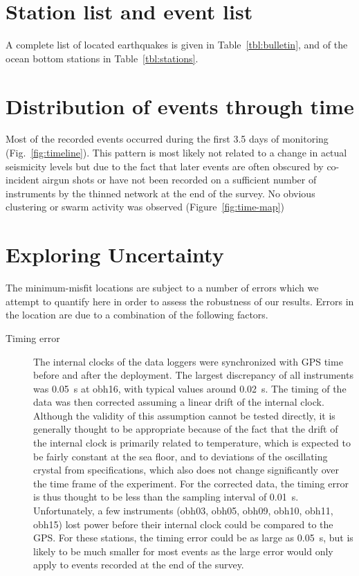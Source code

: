 \documentclass[jgr]{agu2001}
\newlength{\tw}
\begin{document}
\begin{article}
\appendix

\section{Station list and event list}

A complete list of located earthquakes is given in
Table~\ref{tbl:bulletin}, and of the ocean bottom stations in Table~\ref{tbl:stations}.

\section{Distribution of events through time}

Most of the recorded events occurred during the first 3.5 days of
monitoring (Fig.~\ref{fig:timeline}). This pattern is most likely not
related to a change in actual seismicity levels but due to the fact
that later events are often obscured by co-incident airgun shots or
have not been  recorded  on a sufficient number
of instruments by the thinned network at the end of the survey.   No
obvious clustering or swarm activity was observed (Figure~\ref{fig:time-map})

\section{Exploring Uncertainty}

The minimum-misfit locations are subject to a number of errors which
we attempt to quantify here in order to assess the robustness of our results.
   Errors in the location are due to a combination of
the following factors.
\begin{description}
\item[Timing error]  The internal clocks of the data loggers were
synchronized with GPS time before and after the deployment.  The
largest discrepancy of all instruments was 0.05~s at obh16, with
typical values around 0.02~s.  The
timing of the data was then corrected assuming a linear drift of the
internal clock. Although the validity of this assumption cannot be
tested directly, it is generally thought to be appropriate because of
the fact that the drift of the internal clock is primarily related to
temperature, which is expected to be fairly constant at
the sea floor, and to deviations of the oscillating crystal from
specifications, which also does not change significantly over the 
time frame of the experiment. For the corrected data, the timing error
is thus thought to be less than the sampling interval of 0.01~s.
Unfortunately, a few instruments (obh03,
obh05, obh09, obh10, obh11, obh15) lost
power before their internal clock could be compared to the GPS.  For
these stations, the timing error could be as large as 0.05~s, but is
likely to be much smaller for most events as the large error would
only apply to events recorded at the end of the survey.


\end{description}
\end{article}
\end{document}
